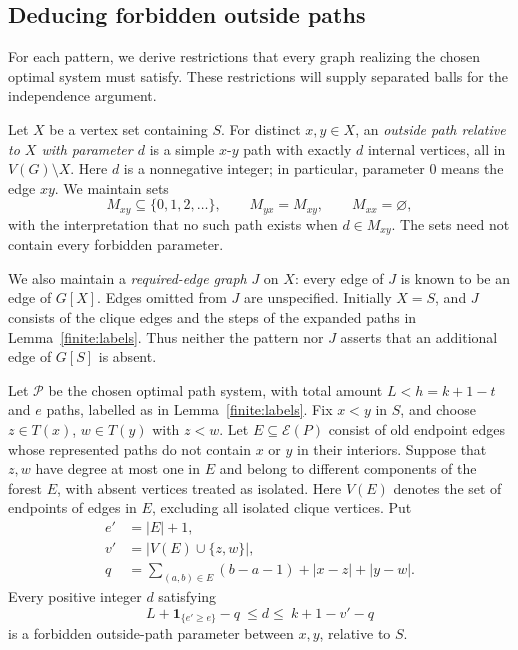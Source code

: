 \subsection{Deducing forbidden outside paths}
\label{finite:constraints}

For each pattern, we derive restrictions that every graph realizing the
chosen optimal system must satisfy.  These restrictions will supply
separated balls for the independence argument.

Let \(X\) be a vertex set containing \(S\).  For distinct \(x,y\in X\),
an \emph{outside path relative to \(X\) with parameter \(d\)} is a simple
\(x\)-\(y\) path with exactly \(d\) internal vertices, all in
\(V(G)\setminus X\).  Here \(d\) is a nonnegative integer; in particular,
parameter \(0\) means the edge \(xy\).  We maintain sets
\[
 M_{xy}\subseteq\{0,1,2,\ldots\},\qquad
 M_{yx}=M_{xy},\qquad M_{xx}=\varnothing,
\]
with the interpretation that no such path exists when \(d\in M_{xy}\).
The sets need not contain every forbidden parameter.

We also maintain a \emph{required-edge graph} \(J\) on \(X\): every edge
of \(J\) is known to be an edge of \(G[X]\).  Edges omitted from \(J\)
are unspecified.  Initially \(X=S\), and \(J\) consists of the clique
edges and the steps of the expanded paths in
Lemma~\ref{finite:labels}.  Thus neither the pattern nor \(J\) asserts
that an additional edge of \(G[S]\) is absent.

\begin{lemma}\label{finite:extension-rule}
Let \(\mathcal P\) be the chosen optimal path system, with total amount
\(L<h=k+1-t\) and \(e\) paths, labelled as in
Lemma~\ref{finite:labels}.  Fix \(x<y\) in \(S\), and choose
\(z\in T(x)\), \(w\in T(y)\) with \(z<w\).  Let
\(E\subseteq\mathcal E(P)\) consist of old endpoint edges whose
represented paths do not contain \(x\) or \(y\) in their interiors.
Suppose that \(z,w\) have degree at most one in \(E\) and belong to
different components of the forest \(E\), with absent vertices treated
as isolated.  Here \(V(E)\) denotes the set of endpoints of edges in
\(E\), excluding all isolated clique vertices. Put
\[
 \begin{split}
 e'&=|E|+1,\\
 v'&=\bigl|V(E)\cup\{z,w\}\bigr|,\\
 q&=\sum_{(a,b)\in E}(b-a-1)+|x-z|+|y-w|.
 \end{split}
\]
Every positive integer \(d\) satisfying
\begin{equation}\label{finite:extension-interval}
 L+\mathbf 1_{\{e'\ge e\}}-q
 \ \le d\le\
 k+1-v'-q
\end{equation}
is a forbidden outside-path parameter between \(x,y\), relative to \(S\).
\end{lemma}

